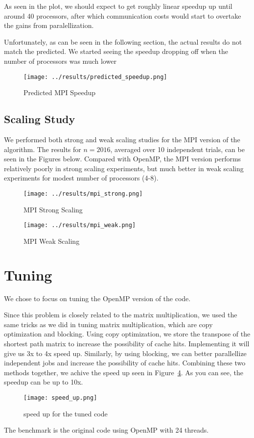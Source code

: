 \documentclass[11pt]{article}
\begin{document}
As seen in the plot, we should expect to get roughly linear speedup up until around 
40 processors, after which communication costs would start to overtake the gains from
paralellization.

Unfortunately, as can be seen in the following section,
the actual results do not match the predicted.  We started seeing the speedup
dropping off when the number of processors was much lower

\begin{figure}
\caption{Predicted MPI Speedup}
\label{mpi-predicted-speedup}
\texttt{[image: ../results/predicted\_speedup.png]}
\end{figure}

\subsection*{Scaling Study}

We performed both strong and weak scaling studies for the MPI version of the algorithm.
The results for $n=2016$, averaged over 10 independent trials, can be seen in the Figures
below.  Compared with OpenMP, the MPI version performs relatively poorly in strong scaling 
experiments, but much better in weak scaling experiments for modest number of processors (4-8).

\begin{figure}
\caption{MPI Strong Scaling}
\label{mpi-strong-scaling}
\texttt{[image: ../results/mpi\_strong.png]}
\end{figure}

\begin{figure}
\caption{MPI Weak Scaling}
\label{mpi-weak-scaling}
\texttt{[image: ../results/mpi\_weak.png]}
\end{figure}

\section*{Tuning}
    We chose to focus on tuning the OpenMP version of the code.

    Since this problem is closely related to the matrix multiplication, we used the same tricks as we did in tuning matrix multiplication, which are copy optimization and blocking. Using copy optimization, we store the transpose of the shortest path matrix to increase the possibility of cache hits. Implementing it will give us 3x to 4x speed up. Similarly, by using blocking, we can better parallellize independent jobs and increase the possibility of cache hits. Combining these two methods together, we achive the speed up seen in Figure~\ref{su}. As you can see, the speedup can be up to 10x.

    \begin{figure}
    \caption{speed up for the tuned code}
    \label{su}
    \texttt{[image: speed\_up.png]}
    \end{figure}

	The benchmark is the original code using OpenMP with 24 threads.
\end{document}
